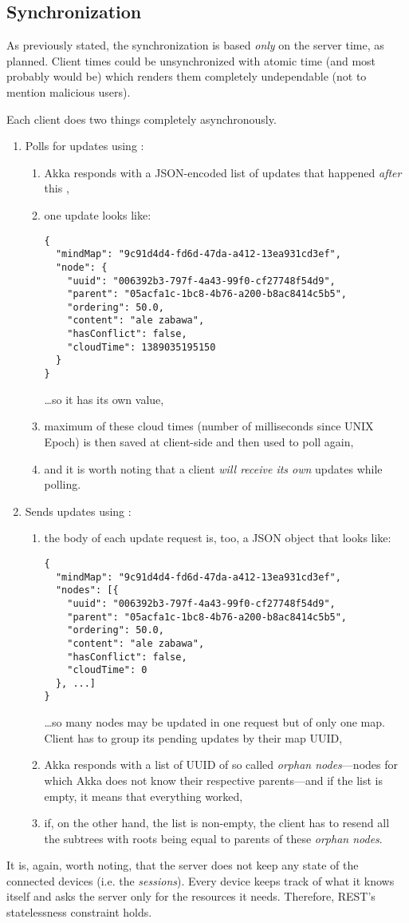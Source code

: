 \subsection{Synchronization}
\label{subsection:akka-synchro}
As previously stated, the synchronization is based \emph{only} on the server time, as planned. Client times could be unsynchronized with atomic time (and most probably would be) which renders them completely undependable (not to mention malicious users).

Each client does two things completely asynchronously.

\begin{enumerate}
	\item Polls for updates using : \begin{enumerate}
		\item Akka responds with a JSON-encoded list of updates that happened \emph{after} this ,
		\item one update looks like:\begin{verbatim}
{
  "mindMap": "9c91d4d4-fd6d-47da-a412-13ea931cd3ef",
  "node": {
    "uuid": "006392b3-797f-4a43-99f0-cf27748f54d9",
    "parent": "05acfa1c-1bc8-4b76-a200-b8ac8414c5b5",
    "ordering": 50.0,
    "content": "ale zabawa",
    "hasConflict": false,
    "cloudTime": 1389035195150
  }
}
		\end{verbatim}\ldots so it has its own  value,
		\item maximum of these cloud times (number of milliseconds since UNIX Epoch) is then saved at client-side and then used to poll again,
		\item and it is worth noting that a client \emph{will receive its own} updates while polling.
	\end{enumerate}
	\item Sends updates using : \begin{enumerate}
		\item the body of each update request is, too, a JSON object that looks like:\begin{verbatim}
{
  "mindMap": "9c91d4d4-fd6d-47da-a412-13ea931cd3ef",
  "nodes": [{
    "uuid": "006392b3-797f-4a43-99f0-cf27748f54d9",
    "parent": "05acfa1c-1bc8-4b76-a200-b8ac8414c5b5",
    "ordering": 50.0,
    "content": "ale zabawa",
    "hasConflict": false,
    "cloudTime": 0
  }, ...]
}
		\end{verbatim} \ldots so many nodes may be updated in one request but of only one map. Client has to group its pending updates by their map UUID,
		\item Akka responds with a list of UUID of so called \emph{orphan nodes}---nodes for which Akka does not know their respective parents---and if the list is empty, it means that everything worked,
		\item if, on the other hand, the list is non-empty, the client has to resend all the subtrees with roots being equal to parents of these \emph{orphan nodes}.
	\end{enumerate}
\end{enumerate}

It is, again, worth noting, that the server does not keep any state of the connected devices (i.e. the \emph{sessions}). Every device keeps track of what it knows itself and asks the server only for the resources it needs. Therefore, REST's statelessness constraint holds.
